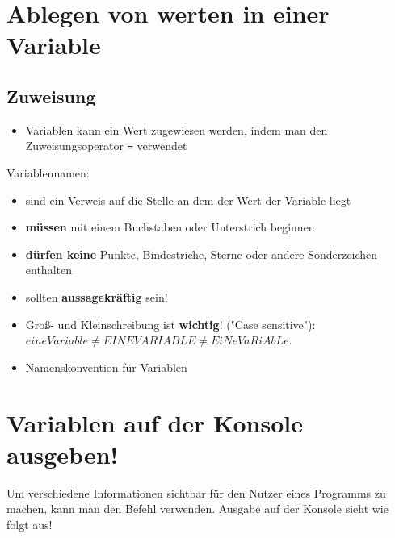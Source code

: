 \section{Ablegen von werten in einer Variable}
\subsection{Zuweisung}
\begin{frame}
    \slidehead
    \begin{itemize}[<+->]
        \item Variablen kann ein Wert zugewiesen werden, indem man den Zuweisungsoperator \lstinline{=} verwendet\\

    \end{itemize}
    \onslide<+->
\end{frame}

\livecoding

\begin{frame}
    \slidehead

    Variablennamen:
    \begin{itemize}[<+->]
        \item sind ein Verweis auf die Stelle an dem der Wert der Variable liegt
        \item \textbf{müssen} mit einem Buchstaben oder Unterstrich beginnen
        \item \textbf{dürfen keine} Punkte, Bindestriche, Sterne oder andere Sonderzeichen enthalten
        \item sollten \textbf{aussagekräftig} sein!
        \item Groß- und Kleinschreibung ist \textbf{wichtig}! ("Case sensitive"):\\ $eineVariable \neq EINEVARIABLE \neq EiNeVaRiAbLe$.
        \item Namenskonvention  für Variablen
    \end{itemize}
\end{frame}

\section{Variablen auf der Konsole ausgeben!}
\begin{frame}
    \slidehead
    Um verschiedene Informationen sichtbar für den Nutzer eines Programms zu machen, kann man den Befehl  verwenden.
    Ausgabe auf der Konsole sieht wie folgt aus!
\end{frame}

